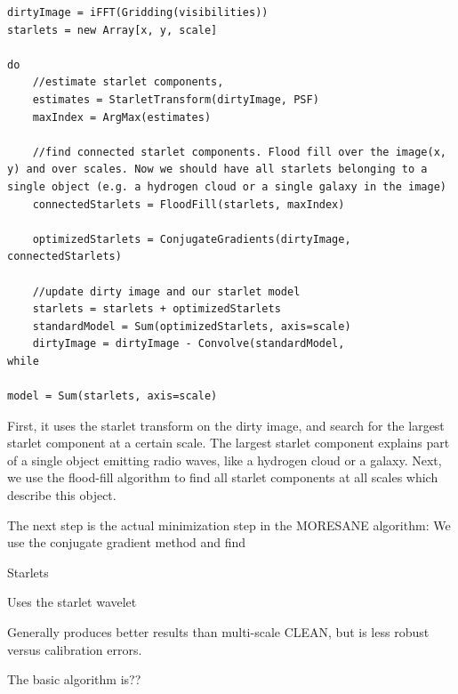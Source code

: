 \begin{lstlisting}
dirtyImage = iFFT(Gridding(visibilities))
starlets = new Array[x, y, scale]

do
	//estimate starlet components,
	estimates = StarletTransform(dirtyImage, PSF)
	maxIndex = ArgMax(estimates)
	
	//find connected starlet components. Flood fill over the image(x, y) and over scales. Now we should have all starlets belonging to a single object (e.g. a hydrogen cloud or a single galaxy in the image)
	connectedStarlets = FloodFill(starlets, maxIndex)
	
	optimizedStarlets = ConjugateGradients(dirtyImage, connectedStarlets)
	
	//update dirty image and our starlet model
	starlets = starlets + optimizedStarlets
	standardModel = Sum(optimizedStarlets, axis=scale)
	dirtyImage = dirtyImage - Convolve(standardModel, 
while

model = Sum(starlets, axis=scale)
\end{lstlisting}

First, it uses the starlet transform on the dirty image, and search for the largest starlet component at a certain scale. The largest starlet component explains part of a single object emitting radio waves, like a hydrogen cloud or a galaxy. Next, we use the flood-fill algorithm to find all starlet components at all scales which describe this object.

The next step is the actual minimization step in the MORESANE algorithm: We use the conjugate gradient method and find 

Starlets 

Uses the starlet wavelet 

Generally produces better results than multi-scale CLEAN, but is less robust versus calibration errors.

The basic algorithm is??




